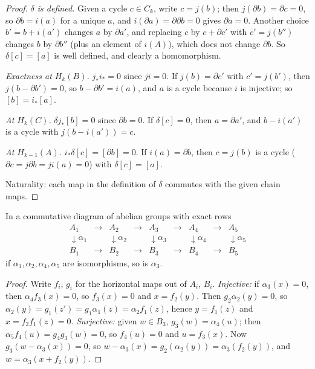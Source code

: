 \begin{proof}
\emph{$\delta$ is defined.} Given a cycle $c\in C_k$, write $c=j(b)$; then $j(\partial b)=\partial c=0$, so $\partial b=i(a)$ for a unique $a$, and $i(\partial a)=\partial\partial b=0$ gives $\partial a=0$. Another choice $b'=b+i(a')$
changes $a$ by $\partial a'$, and replacing $c$ by $c+\partial c'$ with $c'=j(b'')$ changes $b$ by $\partial b''$ (plus an element of $i(A)$), which does not change $\partial b$. So $\delta[c]=[a]$ is well defined, and clearly a homomorphism.

\emph{Exactness at $H_k(B)$.} $j_*i_*=0$ since $ji=0$. If $j(b)=\partial c'$ with $c'=j(b')$, then $j(b-\partial b')=0$, so $b-\partial b'=i(a)$, and $a$ is a cycle because $i$ is injective; so $[b]=i_*[a]$.

\emph{At $H_k(C)$.} $\delta j_*[b]=0$ since $\partial b=0$. If $\delta[c]=0$, then $a=\partial a'$, and $b-i(a')$ is a cycle with $j(b-i(a'))=c$.

\emph{At $H_{k-1}(A)$.} $i_*\delta[c]=[\partial b]=0$. If $i(a)=\partial b$, then $c=j(b)$ is a cycle ($\partial c=j\partial b=ji(a)=0$) with $\delta[c]=[a]$.

Naturality: each map in the definition of $\delta$ commutes with the given chain maps.
\end{proof}

\begin{lemma}\label{lem:five}
In a commutative diagram of abelian groups with exact rows
\[\begin{array}{ccccccccc}A_1&\to&A_2&\to&A_3&\to&A_4&\to&A_5\\ \downarrow\alpha_1&&\downarrow\alpha_2&&\downarrow\alpha_3&&\downarrow\alpha_4&&\downarrow\alpha_5\\ B_1&\to&B_2&\to&B_3&\to&B_4&\to&B_5\end{array}\]
if $\alpha_1,\alpha_2,\alpha_4,\alpha_5$ are isomorphisms, so is $\alpha_3$.
\end{lemma}

\begin{proof}
Write $f_i$, $g_i$ for the horizontal maps out of $A_i$, $B_i$. \emph{Injective:} if $\alpha_3(x)=0$, then $\alpha_4f_3(x)=0$, so $f_3(x)=0$ and $x=f_2(y)$. Then $g_2\alpha_2(y)=0$, so
$\alpha_2(y)=g_1(z')=g_1\alpha_1(z)=\alpha_2f_1(z)$, hence $y=f_1(z)$ and $x=f_2f_1(z)=0$. \emph{Surjective:} given $w\in B_3$, $g_3(w)=\alpha_4(u)$; then $\alpha_5f_4(u)=g_4g_3(w)=0$, so $f_4(u)=0$ and $u=f_3(x)$.
Now $g_3(w-\alpha_3(x))=0$, so $w-\alpha_3(x)=g_2(\alpha_2(y))=\alpha_3(f_2(y))$, and $w=\alpha_3(x+f_2(y))$.
\end{proof}

